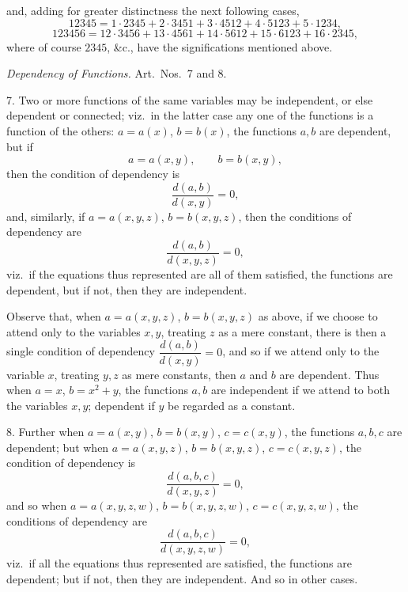 \documentclass[11pt,a4paper]{article}
\begin{document}

and, adding for greater distinctness the next following cases,
\[
12345 = 1 \cdot 2345 + 2 \cdot 3451 + 3 \cdot 4512 + 4 \cdot 5123 + 5 \cdot 1234,
\]
\[
123456 = 12 \cdot 3456 + 13 \cdot 4561 + 14 \cdot 5612 + 15 \cdot 6123 + 16 \cdot 2345,
\]
where of course $2345$, \&c., have the significations mentioned above.

\bigskip

\begin{center}
\emph{Dependency of Functions.} Art.\ Nos.\ 7 and 8.
\end{center}

\medskip

7. Two or more functions of the same variables may be independent, or else dependent or connected; viz.\ in the latter case any one of the functions is a function of the others: $a = a(x)$, $b = b(x)$, the functions $a, b$ are dependent, but if
\[
a = a(x, y), \qquad b = b(x, y),
\]
then the condition of dependency is
\[
\frac{d(a, b)}{d(x, y)} = 0,
\]
and, similarly, if $a = a(x, y, z)$, $b = b(x, y, z)$, then the conditions of dependency are
\[
\frac{d(a, b)}{d(x, y, z)} = 0,
\]
viz.\ if the equations thus represented are all of them satisfied, the functions are dependent, but if not, then they are independent.

Observe that, when $a = a(x, y, z)$, $b = b(x, y, z)$ as above, if we choose to attend only to the variables $x, y$, treating $z$ as a mere constant, there is then a single condition of dependency $\dfrac{d(a, b)}{d(x, y)} = 0$, and so if we attend only to the variable $x$, treating $y, z$ as mere constants, then $a$ and $b$ are dependent. Thus when $a = x$, $b = x^{2} + y$, the functions $a, b$ are independent if we attend to both the variables $x, y$; dependent if $y$ be regarded as a constant.

8. Further when $a = a(x, y)$, $b = b(x, y)$, $c = c(x, y)$, the functions $a, b, c$ are dependent; but when $a = a(x, y, z)$, $b = b(x, y, z)$, $c = c(x, y, z)$, the condition of dependency is
\[
\frac{d(a, b, c)}{d(x, y, z)} = 0,
\]
and so when $a = a(x, y, z, w)$, $b = b(x, y, z, w)$, $c = c(x, y, z, w)$, the conditions of dependency are
\[
\frac{d(a, b, c)}{d(x, y, z, w)} = 0,
\]
viz.\ if all the equations thus represented are satisfied, the functions are dependent; but if not, then they are independent. And so in other cases.

\newpage

\end{document}
